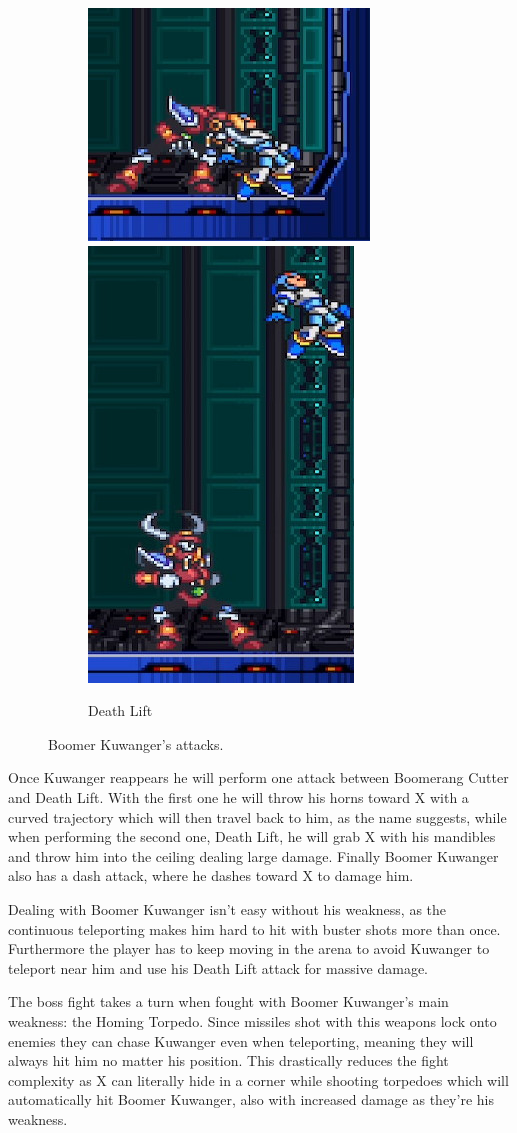 \begin{figure}
	\ContinuedFloat
	\centering
	\begin{subfigure}{\linewidth}
		\centering
		\includegraphics[width=0.4\linewidth]{figures/X1/Boomer_kuwanger/Boomer_lift_1.jpg}
		\includegraphics[width=0.2\linewidth]{figures/X1/Boomer_kuwanger/Boomer_lift_2.jpg}
		\caption{Death Lift}
	\end{subfigure}
	\caption{Boomer Kuwanger's attacks.}
\end{figure}
Once Kuwanger reappears he will perform one attack between Boomerang Cutter and Death Lift. With the first one he will throw his horns toward X with a curved trajectory which will then travel back to him, as the name suggests, while when performing the second one, Death Lift, he will grab X with his mandibles and throw him into the ceiling dealing large damage. Finally Boomer Kuwanger also has a dash attack, where he dashes toward X to damage him.

Dealing with Boomer Kuwanger isn't easy without his weakness, as the continuous teleporting makes him hard to hit with buster shots more than once. Furthermore the player has to keep moving in the arena to avoid Kuwanger to teleport near him and use his Death Lift attack for massive damage.

The boss fight takes a turn when fought with Boomer Kuwanger's main weakness: the Homing Torpedo. Since missiles shot with this weapons lock onto enemies they can chase Kuwanger even when teleporting, meaning they will always hit him no matter his position. This drastically reduces the fight complexity as X can literally hide in a corner while shooting torpedoes which will automatically hit Boomer Kuwanger, also with increased damage as they're his weakness.


